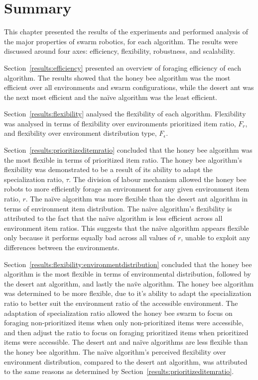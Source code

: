 \section{Summary}
\label{results:summary}

This chapter presented the results of the experiments and performed analysis of the major properties of swarm robotics, for each algorithm. The results were discussed around four axes: efficiency, flexibility, robustness, and scalability. 

Section~\ref{results:efficiency} presented an overview of foraging efficiency of each algorithm. The results showed that the honey bee algorithm was the most efficient over all environments and swarm configurations, while the desert ant was the next most efficient and the na\"ive algorithm was the least efficient.

Section~\ref{results:flexibility} analysed the flexibility of each algorithm. Flexibility was analysed in terms of flexibility over environments prioritized item ratio, $F_r$, and flexibility over environment distribution type, $F_\epsilon$. 

Section~\ref{results:prioritizeditemratio} concluded that the honey bee algorithm was the most flexible in terms of prioritized item ratio. The honey bee algorithm's flexibility was demonstrated to be a result of its ability to adapt the specialization ratio, $\tau$. The division of labour mechanism allowed the honey bee robots to more efficiently forage an environment for any given environment item ratio, $r$. The na\"ive algorithm was more flexible than the desert ant algorithm in terms of environment item distribution. The na\"ive algorithm's flexibility is attributed to the fact that the na\"ive algorithm is less efficient across all environment item ratios. This suggests that the na\"ive algorithm appears flexible only because it performs equally bad across all values of $r$, unable to exploit any differences between the environments. 

Section~\ref{results:flexibility:environmentdistribution} concluded that the honey bee algorithm is the most flexible in terms of environmental distribution, followed by the desert ant algorithm, and lastly the na\"ve algorithm. The honey bee algorithm was determined to be more flexible, due to it's ability to adapt the specialization ratio to better suit the environment ratio of the accessible environment. The adaptation of specialization ratio allowed the honey bee swarm to focus on foraging non-prioritized items when only non-prioritized items were accessible, and then adjust the ratio to focus on foraging prioritized items when prioritized items were accessible. The desert ant and na\"ive algorithms are less flexible than the honey bee algorithm. The na\"ive algorithm's perceived flexibility over environment distribution, compared to the desert ant algorithm, was attributed to the same reasons as determined by Section~\ref{results:prioritizeditemratio}. 
  
